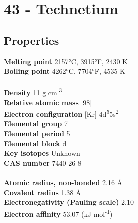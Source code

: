 \section{43 - Technetium}
\label{sec:elem-technetium}
\subsection{Properties}
\textbf{Melting point} 2157°C, 3915°F, 2430 K\\
\textbf{Boiling point} 4262°C, 7704°F, 4535 K\\
\\
\textbf{Density} 11 g cm\textsuperscript{-3}\\
\textbf{Relative atomic mass} [98]\\
\textbf{Electron configuration} [Kr] 4d\textsuperscript{5}5s\textsuperscript{2}\\
\textbf{Elemental group} 7\\
\textbf{Elemental period} 5\\
\textbf{Elemental block} d\\
\textbf{Key isotopes} Unknown\\
\textbf{CAS number} 7440-26-8\\
\\
\textbf{Atomic radius, non-bonded} 2.16 Å\\
\textbf{Covalent radius} 1.38 Å\\
\textbf{Electronegativity (Pauling scale)} 2.10\\
\textbf{Electron affinity} 53.07 (kJ mol\textsuperscript{-1})\\